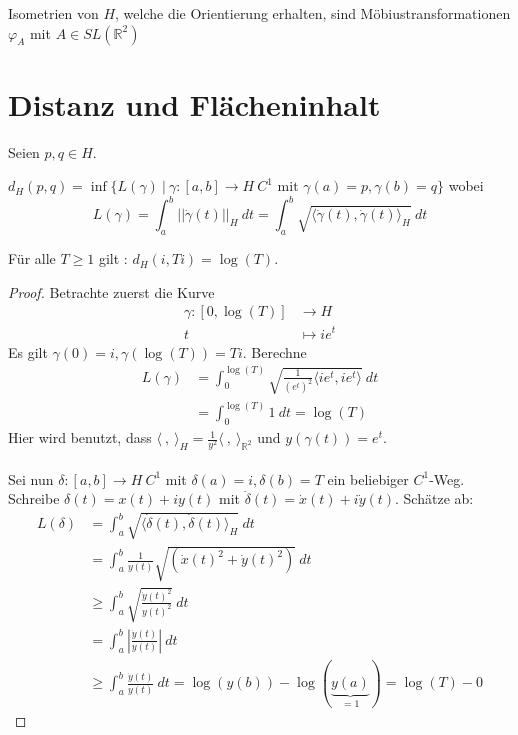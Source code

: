 \documentclass[../main.tex]{subfiles}
\begin{document}
\begin{consequence}
    Isometrien von $H$, welche die Orientierung erhalten, sind Möbiustransformationen $\varphi _A$ mit $A \in SL(\mathbb{R}^2)$
\end{consequence}

\section{Distanz und Flächeninhalt}
Seien $p, q \in H$.
\begin{definition}
    $d_H (p,q) = \inf \{L(\gamma) \ | \ \gamma : [a,b] \to H \ C^1 \text{ mit } \gamma (a)=p, \gamma(b)=q \}$
    wobei
    $$L(\gamma) = \int_a^b || \dot{\gamma}(t)||_H \ dt = \int _a^b \sqrt{\langle \dot{\gamma}(t), \dot{\gamma}(t) \rangle _H} \ dt$$
\end{definition}

\begin{lemma}
    Für alle $T \ge 1$ gilt : $d _H (i, Ti) = \log (T)$.
\end{lemma}
\begin{proof}
    Betrachte zuerst die Kurve
    \begin{align*}
        \gamma : [0, \log(T)] & \to H \\
        t & \mapsto ie^t
    \end{align*}
    Es gilt $\gamma(0) = i, \gamma(\log(T))= Ti$. Berechne
    \begin{align*}
        L (\gamma) &= \int _0 ^{\log (T)} \sqrt{\frac{1}{(e^t)^2}\langle ie^t, ie^t \rangle} \ dt \\
        &= \int _0 ^{\log (T)} 1 \ dt = \log (T)
    \end{align*}
    Hier wird benutzt, dass $\langle \ , \ \rangle _H = \frac{1}{y^2} \langle \ , \ \rangle _ {\mathbb{R}^2}$ und $y(\gamma (t))= e^t$.
    \\ \\
    Sei nun $\delta :[a,b] \to H \ C^1$ mit $\delta (a) =i, \delta (b)=T$ ein beliebiger $C^1$-Weg.
    Schreibe $\delta (t) = x(t)+ iy(t)$ mit $\dot{\delta}(t)=\dot{x}(t)+i\dot{y}(t)$.
    Schätze ab:
    \begin{align*}
        L (\delta) &= \int _a ^b \sqrt{\langle \dot{\delta}(t), \dot{\delta}(t) \rangle _H} \ dt \\
        &= \int _a ^b \frac{1}{y(t)} \sqrt{(\dot{x}(t)^2+\dot{y}(t)^2)} \ dt \\
        & \ge \int _a ^b \sqrt{\frac{\dot{y}(t)^2}{y(t)^2}} \ dt \\
        &= \int _a ^b \left | \frac{\dot{y}(t)}{y(t)} \right | \ dt \\
        &\ge \int _a ^b \frac{\dot{y}(t)}{y(t)} \ dt = \log (y(b)) - \log(\underbrace{y(a)}_{=1})= \log(T) - 0
    \end{align*}    
\end{proof}
\end{document}
